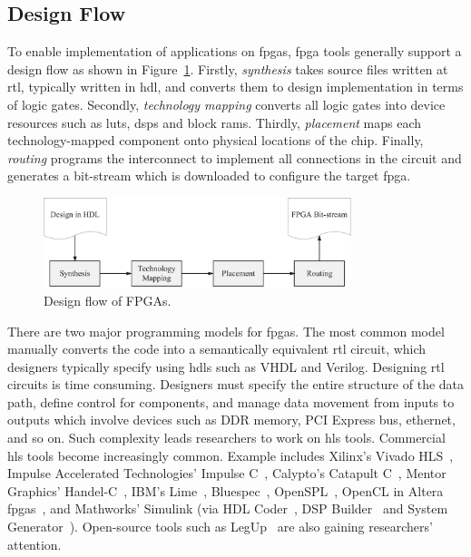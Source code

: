 \subsection{Design Flow}

To enable implementation of applications on \glspl{fpga}, \gls{fpga} tools generally support a design flow as shown in Figure~\ref{fig:bg_flow}.
Firstly, \textit{synthesis} takes source files written at \gls{rtl}, typically written in \gls{hdl}, and converts them to design implementation in terms of logic gates.
Secondly, \textit{technology mapping} converts all logic gates into device resources such as \glspl{lut}, \glspl{dsp} and block \glspl{ram}.
Thirdly, \textit{placement} maps each technology-mapped component onto physical locations of the chip.
Finally, \textit{routing} programs the interconnect to implement all connections in the circuit and generates a bit-stream which is downloaded to configure the target \gls{fpga}.

\begin{figure}[ht]
\begin{center}
\includegraphics[width=0.8\textwidth]{2_background/figures/flow}
\end{center}
\caption{Design flow of FPGAs.}
\label{fig:bg_flow}
\end{figure}

There are two major programming models for \glspl{fpga}.
The most common model manually converts the code into a semantically equivalent \gls{rtl} circuit, which designers typically specify using \glspl{hdl} such as VHDL and Verilog.
Designing \gls{rtl} circuits is time consuming.
Designers must specify the entire structure of the data path, define control for components, and manage data movement from inputs to outputs which involve devices such as DDR memory, PCI Express bus, ethernet, and so on.
Such complexity leads researchers to work on \gls{hls} tools.
Commercial \gls{hls} tools become increasingly common.
Example includes Xilinx's Vivado HLS~\cite{xilinxvivado}, Impulse Accelerated Technologies' Impulse C~\cite{impulsec}, Calypto's Catapult C~\cite{catapultc}, Mentor Graphics' Handel-C~\cite{handelc}, IBM's Lime~\cite{lime}, Bluespec~\cite{bluespec}, OpenSPL~\cite{openspl,maxcompiler}, OpenCL in Altera \glspl{fpga}~\cite{alteraopencl}, and Mathworks' Simulink (via HDL Coder~\cite{hdlcoder}, DSP Builder~\cite{alteradspbuilder} and System Generator~\cite{xilinxsysgen}).
Open-source tools such as LegUp~\cite{legup} are also gaining researchers' attention.

